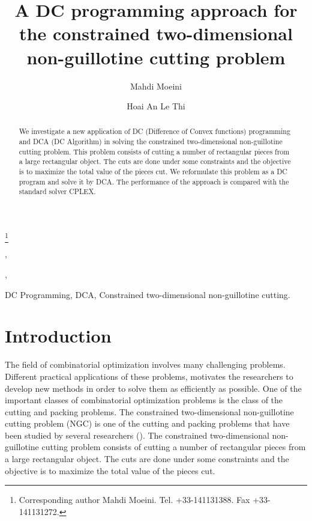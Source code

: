 \documentclass{iesmart}
\begin{document}
\begin{frontmatter}


\title{
A DC programming approach for the constrained two-dimensional
non-guillotine cutting problem} \thanks[footnoteinfo]{Corresponding author Mahdi Moeini. Tel. +33-141131388. Fax +33-141131272.}

\author[Paestum]{Mahdi Moeini},    \author[Rome]{Hoai An Le Thi},               

\address[Paestum]{Laboratoire G\'enie Industriel (LGI), \'Ecole Centrale Paris, Grande Voie des Vignes, F-92 295, Ch\^{a}tenay-Malabry, France.}  \address[Rome]{Laboratoire d'Informatique
Th\'eorique et Appliqu\'ee
 (LITA), Universit\'e Paul Verlaine - Metz,\\ Ile du Saulcy, 57045, Metz, France.}             


\begin{abstract}
We investigate a new application of DC (Difference of Convex
functions) programming and DCA (DC Algorithm) in solving the
constrained two-dimensional non-guillotine cutting problem. This
problem consists of cutting a number of rectangular pieces from a
large rectangular object. The cuts are done under some constraints
and the objective is to maximize the total value of the pieces
cut. We reformulate this problem as a DC program and solve it by
DCA. The performance of the approach is compared with the standard
solver CPLEX.
\end{abstract}
\begin{keyword}
DC Programming, DCA, Constrained two-dimensional non-guillotine
cutting.
\end{keyword}
\end{frontmatter}

\section{Introduction}
\label{sec:Introduction}

The field of combinatorial optimization involves many challenging
problems. Different practical applications of these problems,
motivates the researchers to develop new methods in order to solve
them as efficiently as possible. One of the important classes of
combinatorial optimization problems is the class of the cutting
and packing problems. The constrained two-dimensional
non-guillotine cutting problem (NGC) is one of the cutting and
packing problems that have been studied by several researchers
(\cite{Beasley1985,Beasley2004,Nepomuceno,Wang}). The constrained
two-dimensional non-guillotine cutting problem consists of cutting
a number of rectangular pieces from a large rectangular object.
The cuts are done under some constraints and the objective is to
maximize the total value of the pieces cut.
\end{document}
